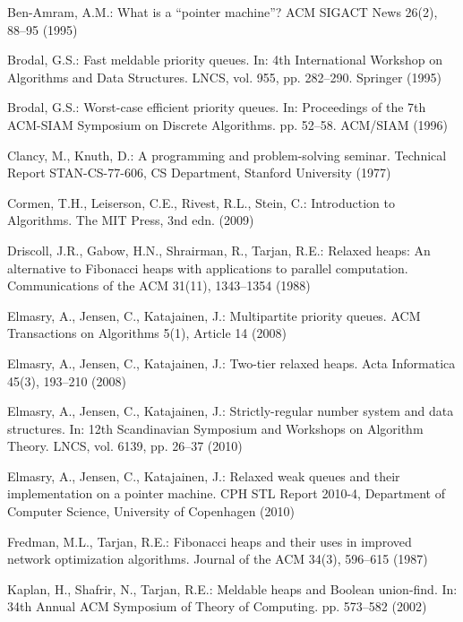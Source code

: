 \documentclass{llncs}
\begin{document}
\begin{thebibliography}{10}
\providecommand{\url}[1]{\texttt{#1}}
\providecommand{\urlprefix}{URL }

Ben-Amram, A.M.: What is a ``pointer machine''? ACM SIGACT News  26(2),  88--95
  (1995)

Brodal, G.S.: Fast meldable priority queues. In: 4th International Workshop on
  Algorithms and Data Structures. LNCS, vol. 955, pp. 282--290. Springer (1995)

Brodal, G.S.: Worst-case efficient priority queues. In: Proceedings of the 7th
  ACM-SIAM Symposium on Discrete Algorithms. pp. 52--58. ACM/SIAM (1996)

Clancy, M., Knuth, D.: A programming and problem-solving seminar. Technical
  Report STAN-CS-77-606, CS Department, Stanford University (1977)

Cormen, T.H., Leiserson, C.E., Rivest, R.L., Stein, C.: Introduction to
  Algorithms. The MIT Press, 3nd edn. (2009)

Driscoll, J.R., Gabow, H.N., Shrairman, R., Tarjan, R.E.: Relaxed heaps: {A}n
  alternative to {F}ibonacci heaps with applications to parallel computation.
  Communications of the ACM  31(11),  1343--1354 (1988)

Elmasry, A., Jensen, C., Katajainen, J.: Multipartite priority queues. ACM
  Transactions on Algorithms  5(1),  Article 14 (2008)

Elmasry, A., Jensen, C., Katajainen, J.: Two-tier relaxed heaps. Acta
  Informatica  45(3),  193--210 (2008)

Elmasry, A., Jensen, C., Katajainen, J.: Strictly-regular number system and
  data structures. In: 12th Scandinavian Symposium and Workshops on Algorithm
  Theory. LNCS, vol. 6139, pp. 26--37 (2010)

Elmasry, A., Jensen, C., Katajainen, J.: Relaxed weak queues and their
  implementation on a pointer machine. CPH STL Report 2010-4, Department of
  Computer Science, University of Copenhagen (2010)

Fredman, M.L., Tarjan, R.E.: Fibonacci heaps and their uses in improved network
  optimization algorithms. Journal of the ACM  34(3),  596--615 (1987)

Kaplan, H., Shafrir, N., Tarjan, R.E.: Meldable heaps and {B}oolean union-find.
  In: 34th Annual ACM Symposium of Theory of Computing. pp. 573--582 (2002)


\end{thebibliography}
\end{document}
